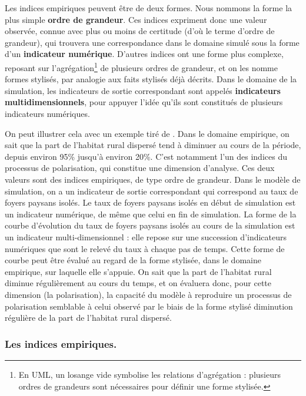 Les indices empiriques peuvent être de deux formes.
Nous nommons la forme la plus simple \og \textbf{ordre de grandeur}\fg{}.
Ces indices expriment donc une valeur observée, connue avec plus ou moins de certitude (d'où le terme d'ordre de grandeur), qui trouvera une correspondance dans le domaine simulé sous la forme d'un \textbf{indicateur numérique}.
D'autres indices ont une forme plus complexe, reposant sur l'agrégation\footnote{
En UML, un losange vide symbolise les relations d'agrégation : plusieurs ordres de grandeurs sont nécessaires pour définir une forme stylisée.
} de plusieurs ordres de grandeur, et on les nomme \og formes stylisés\fg{}, par analogie aux faits stylisés déjà décrits.
Dans le domaine de la simulation, les indicateurs de sortie correspondant sont appelés \og \textbf{indicateurs multidimensionnels}\fg{}, pour appuyer l'idée qu'ils sont constitués de plusieurs indicateurs numériques.

On peut illustrer cela avec un exemple tiré de \simfeodal{}.
Dans le domaine empirique, on sait que la part de l'habitat rural dispersé tend à diminuer au cours de la période, depuis environ 95\% jusqu'à environ 20\%.
C'est notamment l'un des indices du processus de polarisation, qui constitue une dimension d'analyse.
Ces deux valeurs sont des indices empiriques, de type \og ordre de grandeur\fg{}.
Dans le modèle de simulation, on a un indicateur de sortie correspondant qui correspond au taux de foyers paysans isolés.
Le taux de foyers paysans isolés en début de simulation est un indicateur numérique, de même que celui en fin de simulation.
La forme de la courbe d'évolution du taux de foyers paysans isolés au cours de la simulation est un indicateur multi-dimensionnel : elle repose sur une succession d'indicateurs numériques que sont le relevé du taux à chaque pas de temps.
Cette forme de courbe peut être évalué au regard de la forme stylisée, dans le domaine empirique, sur laquelle elle s'appuie.
On sait que la part de l'habitat rural diminue régulièrement au cours du temps, et on évaluera donc, pour cette dimension (la polarisation), la capacité du modèle à reproduire un processus de polarisation semblable à celui observé par le biais de la forme stylisé \og diminution régulière de la part de l'habitat rural dispersé\fg{}.


\subsubsection{Les indices empiriques.}


